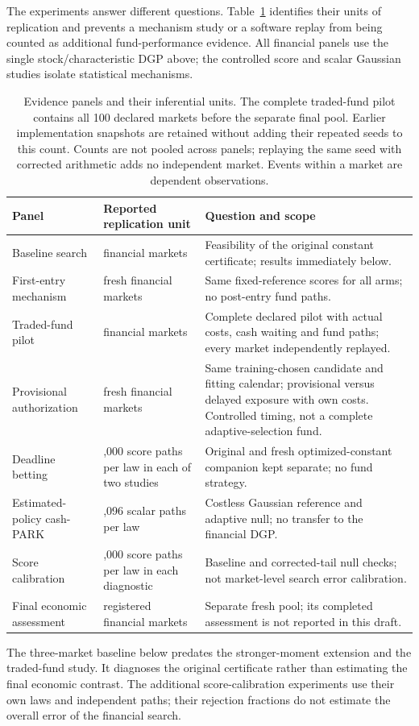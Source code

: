 The experiments answer different questions. Table~\ref{tab:evidence-scope}
identifies their units of replication and prevents a mechanism study or a
software replay from being counted as additional fund-performance evidence.
All financial panels use the single stock/characteristic DGP above; the
controlled score and scalar Gaussian studies isolate statistical mechanisms.

\begin{table}[H]\centering\small
\begin{tabular}{>{\raggedright\arraybackslash}p{.22\linewidth}
                >{\raggedright\arraybackslash}p{.23\linewidth}
                >{\raggedright\arraybackslash}p{.45\linewidth}}
\toprule
Panel & Reported replication unit & Question and scope\\\midrule
Baseline search & 3 financial markets & Feasibility of the original constant
certificate; results immediately below.\\[3pt]
First-entry mechanism & 20 fresh financial markets & Same fixed-reference
scores for all arms; no post-entry fund paths.\\[3pt]
Traded-fund pilot & 100 financial markets & Complete declared pilot with actual
costs, cash waiting and fund paths; every market independently replayed.\\[3pt]
Provisional authorization & 100 fresh financial markets & Same training-chosen
candidate and fitting calendar; provisional versus delayed exposure with own
costs. Controlled timing, not a complete adaptive-selection fund.\\[3pt]
Deadline betting & 20,000 score paths per law in each of two studies & Original
and fresh optimized-constant companion kept separate; no fund strategy.\\[3pt]
Estimated-policy cash-PARK & 4,096 scalar paths per law & Costless Gaussian
reference and adaptive null; no transfer to the financial DGP.\\[3pt]
Score calibration & 10,000 score paths per law in each diagnostic & Baseline
and corrected-tail null checks; not market-level search error calibration.\\[3pt]
Final economic assessment & 500 registered financial markets & Separate fresh
pool; its completed assessment is not reported in this draft.\\
\bottomrule
\end{tabular}
\caption{Evidence panels and their inferential units. The complete traded-fund
pilot contains all 100 declared markets before the separate final pool.
Earlier implementation snapshots are retained without adding their repeated
seeds to this count. Counts are not pooled across
panels; replaying the same seed with corrected arithmetic adds no independent
market. Events within a market are dependent observations.}
\label{tab:evidence-scope}
\end{table}

The three-market baseline below predates the stronger-moment extension and
the traded-fund study. It diagnoses the original certificate rather than
estimating the final economic contrast. The additional score-calibration
experiments use their own laws and independent paths; their rejection
fractions do not estimate the overall error of the financial search.
